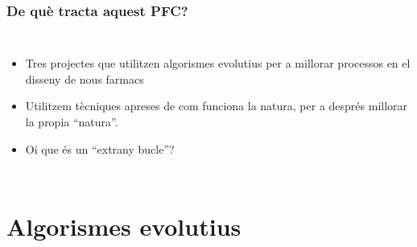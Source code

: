 \documentclass{beamer}
\begin{document}
\begin{frame}
\frametitle{De què tracta aquest PFC?}
	\begin{columns}[c]
		\begin{itemize}
			\item Tres projectes que utilitzen algorismes evolutius per a millorar processos en el
				disseny de nous farmacs
			\item Utilitzem tècniques apreses de com funciona la natura, per a després millorar la
				propia ``natura''.
			\item Oi que és un ``extrany bucle''?
		\end{itemize}
	\end{columns}
\end{frame}



\section{Algorismes evolutius} %
\label{sec:Algorismes evolutius}
\end{document}
